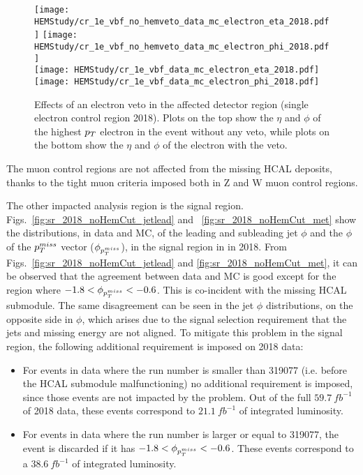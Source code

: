 \begin{figure}[htbp]
    \begin{center}
        \texttt{[image: HEMStudy/cr\_1e\_vbf\_no\_hemveto\_data\_mc\_electron\_eta\_2018.pdf]}
        \texttt{[image: HEMStudy/cr\_1e\_vbf\_no\_hemveto\_data\_mc\_electron\_phi\_2018.pdf]} \\
        \texttt{[image: HEMStudy/cr\_1e\_vbf\_data\_mc\_electron\_eta\_2018.pdf]}
        \texttt{[image: HEMStudy/cr\_1e\_vbf\_data\_mc\_electron\_phi\_2018.pdf]}
    \end{center}
    \caption{Effects of an electron veto in the affected detector region (single electron control region 2018). 
    Plots on the top show the $\eta$ and $\phi$ of the highest $p_T$ electron in the event
    without any veto, while plots on the bottom show the $\eta$ and $\phi$ of the electron with the veto.}
    \label{fig:HEM_motivation}
\end{figure}

The muon control regions are not affected from the missing HCAL deposits, 
thanks to the tight muon criteria imposed both in Z and W muon control regions.

The other impacted analysis region is the signal region. 
Figs.~\ref{fig:sr_2018_noHemCut_jetlead} and ~\ref{fig:sr_2018_noHemCut_met} show the distributions, in data and MC, of the leading and subleading 
jet $\phi$ and the $\phi$ of the $p_T^{miss}$ vector ($\phi_{p_T^{miss}}$), in the signal region in in 2018. 
From Figs.~\ref{fig:sr_2018_noHemCut_jetlead} and \ref{fig:sr_2018_noHemCut_met}, it can be observed that the agreement between data and MC is good 
except for the region where $-1.8 < \phi_{p_T^{miss}} < -0.6$. This is co-incident 
with the missing HCAL submodule. The same disagreement can be seen in the jet $\phi$ distributions, on the opposite side in $\phi$, 
which arises due to the signal selection requirement that the jets and missing energy are not aligned.
To mitigate this problem in the signal region, the following additional requirement is imposed on 2018 data:

\begin{itemize}
    \item For events in data where the run number is smaller than 319077 (i.e. before the HCAL submodule malfunctioning)
    no additional requirement is imposed, since those events are not impacted by the problem. Out of the full $59.7 \ fb^{-1}$
    of 2018 data, these events correspond to $21.1 \ fb^{-1}$ of integrated luminosity.
    \item For events in data where the run number is larger or equal to 319077, the event is discarded
    if it has $-1.8 < \phi_{p_T^{miss}} < -0.6$. These events correspond to a $38.6 \ fb^{-1}$ of integrated luminosity. 
\end{itemize}

